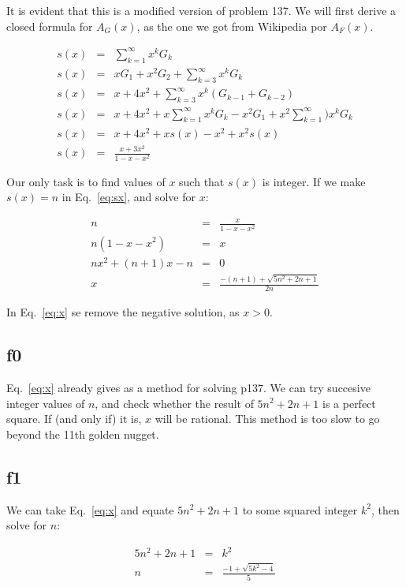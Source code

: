 \documentclass[english]{article}
\begin{document}
It is evident that this is a modified version of problem 137. We will first derive a closed formula for $A_G(x)$, as the one we got from Wikipedia por $A_F(x)$.

\begin{eqnarray}
s(x) & = & \sum_{k=1}^{\infty} x^k G_k \\
s(x) & = & x G_1 + x^2 G_2 + \sum_{k=3}^{\infty} x^k G_k \\
s(x) & = & x + 4x^2 + \sum_{k=3}^{\infty} x^k (G_{k-1} + G_{k-2}) \\
s(x) & = & x + 4x^2 + x \sum_{k=1}^{\infty} x^k G_k - x^2 G_1 + x^2 \sum_{k=1}^{\infty}) x^k G_k \\
s(x) & = & x + 4x^2 + x s(x) - x^2 + x^2 s(x) \\
s(x) & = & \frac{x+3x^2}{1-x-x^2} \label{eq:sx}
\end{eqnarray}

Our only task is to find values of $x$ such that $s(x)$ is integer. If we make $s(x) = n$ in Eq.~\ref{eq:sx}, and solve for $x$:

\begin{eqnarray}
n & = & \frac{x}{1-x-x^2} \\
n (1-x-x^2) & = & x \\
n x^2 + (n+1) x - n & = & 0 \\
x & = & \frac{-(n+1)+\sqrt{5n^2+2n+1}}{2n} \label{eq:x}
\end{eqnarray}

In Eq.~\ref{eq:x} se remove the negative solution, as $x > 0$.

\subsection{f0}

Eq.~\ref{eq:x} already gives as a method for solving p137. We can try succesive integer values of $n$, and check whether the result of $5n^2+2n+1$ is a perfect square. If (and only if) it is, $x$ will be rational. This method is too slow to go beyond the 11th golden nugget.

\subsection{f1}

We can take Eq.~\ref{eq:x} and equate $5n^2+2n+1$ to some squared integer $k^2$, then solve for $n$:

\begin{eqnarray}
5n^2+2n+1 & = & k^2 \\
n & = & \frac{-1+\sqrt{5k^2-4}}{5} \label{eq:n}
\end{eqnarray}
\end{document}
